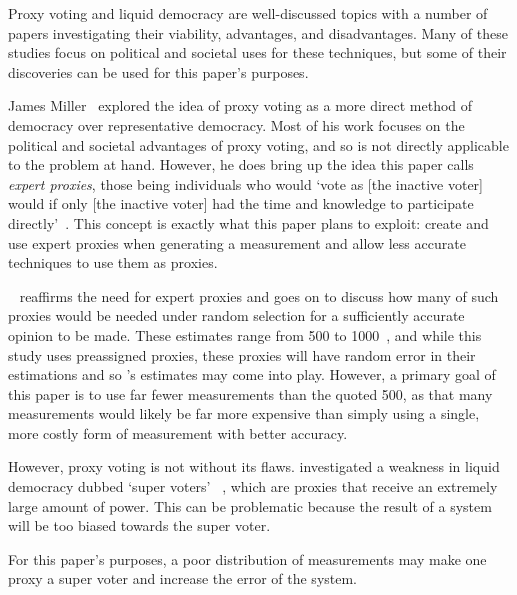 Proxy voting and liquid democracy are well-discussed topics with a number of
papers investigating their viability, advantages, and disadvantages.  
Many of these studies focus on political and societal uses for these techniques,
but some of their discoveries can be used for this paper's purposes.

James Miller~\cite{Miller1969} explored the idea of proxy voting as a more
direct method of democracy over representative democracy.
Most of his work focuses on the political and societal advantages of proxy
voting, and so is not directly applicable to the problem at hand.
However, he does bring up the idea this paper calls \textit{expert proxies},
those being individuals who would `vote as [the inactive voter] would if only
[the inactive voter] had the time and knowledge to participate
directly'~\cite[para.~1.3]{Miller1969}.
This concept is exactly what this paper plans to exploit: create and use expert
proxies when generating a measurement and allow less accurate techniques to use
them as proxies.

~\cite{Mueller1972} reaffirms the need for expert proxies and
goes on to discuss how many of such proxies would be needed under random
selection for a sufficiently accurate opinion to be made.
These estimates range from 500 to 1000~\cite[para.~3.2]{Mueller1972}, and
while this study uses preassigned proxies, these proxies will have random
error in their estimations and so 's estimates may come into
play.
However, a primary goal of this paper is to use far fewer measurements than the
quoted 500, as that many measurements would likely be far more expensive than
simply using a single, more costly form of measurement with better accuracy.

However, proxy voting is not without its flaws.
 investigated a weakness in liquid democracy dubbed `super voters'
~\cite[para.~1.3]{Golz2021}, which are proxies that receive an extremely large
amount of power.
This can be problematic because the result of a system will be too biased
towards the super voter.  

For this paper's purposes, a poor distribution of measurements may make one
proxy a super voter and increase the error of the system.


